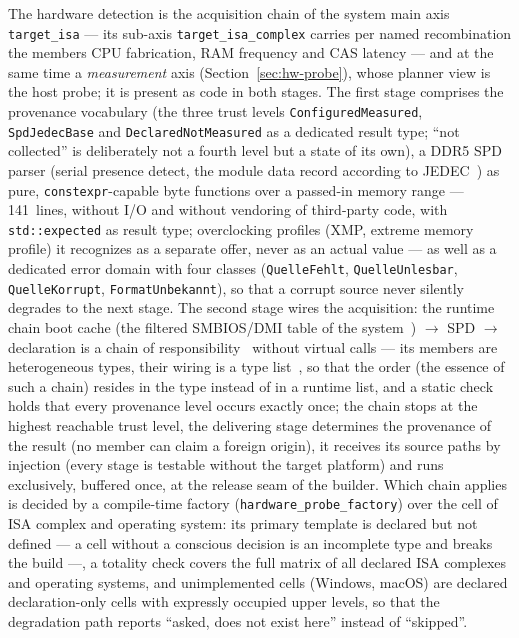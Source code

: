 \begin{nurlang}
The hardware detection is the acquisition chain of the system main axis \texttt{target\_isa} --- its
sub-axis \texttt{target\_isa\_complex} carries per named recombination the members CPU fabrication,
RAM frequency and CAS latency --- and at the same time a \emph{measurement} axis
(Section~\ref{sec:hw-probe}), whose planner view is the host probe; it is present as code in both
stages. The first stage comprises the provenance vocabulary (the three trust levels
\texttt{ConfiguredMeasured}, \texttt{SpdJedecBase} and \texttt{DeclaredNotMeasured} as a dedicated
result type; \enquote{not collected} is deliberately not a fourth level but a state of its own), a
DDR5 SPD parser (serial presence detect, the module data record according to
JEDEC~\cite{jedec_jesd400_5}) as pure, \texttt{constexpr}-capable byte functions over a passed-in
memory range --- 141~lines, without I/O and without vendoring of third-party code, with
\texttt{std::expected} as result type; overclocking profiles (XMP, extreme memory profile) it
recognizes as a separate offer, never as an actual value --- as well as a dedicated error domain with
four classes (\texttt{QuelleFehlt}, \texttt{QuelleUnlesbar}, \texttt{QuelleKorrupt},
\texttt{FormatUnbekannt}), so that a corrupt source never silently degrades to the next stage. The
second stage wires the acquisition: the runtime chain boot cache (the filtered SMBIOS/DMI table of the
system~\cite{dmtf_smbios}) $\to$ SPD $\to$ declaration is a chain of
responsibility~\cite{gamma1994patterns} without virtual calls --- its members are heterogeneous types,
their wiring is a type list~\cite{alexandrescu2001modern}, so that the order (the essence of such a
chain) resides in the type instead of in a runtime list, and a static check holds that every
provenance level occurs exactly once; the chain stops at the highest reachable trust level, the
delivering stage determines the provenance of the result (no member can claim a foreign origin), it
receives its source paths by injection (every stage is testable without the target platform) and runs
exclusively, buffered once, at the release seam of the builder. Which chain applies is decided by a
compile-time factory (\texttt{hardware\_probe\_factory}) over the cell of ISA complex and operating
system: its primary template is declared but not defined --- a cell without a conscious decision is an
incomplete type and breaks the build ---, a totality check covers the full matrix of all declared ISA
complexes and operating systems, and unimplemented cells (Windows, macOS) are declared
declaration-only cells with expressly occupied upper levels, so that the degradation path reports
\enquote{asked, does not exist here} instead of \enquote{skipped}.
\end{nurlang}


